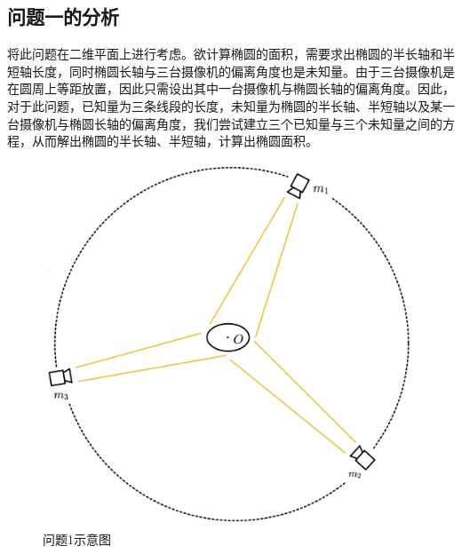 \documentclass[a4paper,10.5pt]{ctexart}
\begin{document}
\subsection{问题一的分析}
将此问题在二维平面上进行考虑。欲计算椭圆的面积，需要求出椭圆的半长轴和半短轴长度，同时椭圆长轴与三台摄像机的偏离角度也是未知量。由于三台摄像机是在圆周上等距放置，因此只需设出其中一台摄像机与椭圆长轴的偏离角度。因此，对于此问题，已知量为三条线段的长度，未知量为椭圆的半长轴、半短轴以及某一台摄像机与椭圆长轴的偏离角度，我们尝试建立三个已知量与三个未知量之间的方程，从而解出椭圆的半长轴、半短轴，计算出椭圆面积。
\begin{figure}[h]%
\centering
\includegraphics[scale=0.28]{示意图.png}
\caption{问题1示意图}
\label{fig:label}
\end{figure}
\end{document}
